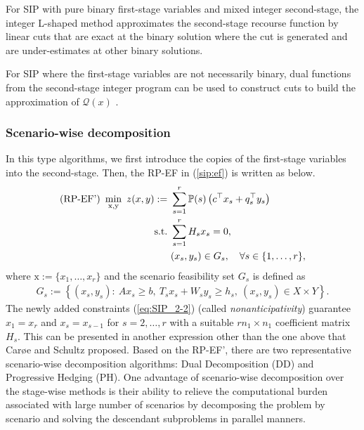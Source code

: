 For SIP with pure binary first-stage variables and mixed integer second-stage, the integer L-shaped method \cite{journal:LL1993} approximates the second-stage recourse function by linear cuts that are exact at the binary solution where the cut is generated and are under-estimates at other binary solutions. 

For SIP where the first-stage variables are not necessarily binary, dual functions from the second-stage integer program can be used to construct cuts to build the approximation of $\mathcal{Q}(x)$ \cite{journal:CT1998}.  %

\subsubsection{Scenario-wise decomposition}
In this type algorithms, we first introduce the copies of the first-stage variables into the second-stage. Then, the RP-EF in (\ref{sip:ef}) is written as below.
\begin{subequations} \label{sip:ef'}
	\begin{align}
	\textrm{(RP-EF') }\min_{\mathrm{x},\mathrm{y}}\ z(x,y):=\ &\sum_{s=1}^{r}\PP(s)\left(c^{\top}x_s+q_s^{\top}y_s\right)	\label{eq:SIP_2-1}\\ 
	\mathrm{s.t.}\ &\sum_{s=1}^{r}H_s x_s=0, \label{eq:SIP_2-2} \\
	\ &(x_s,y_s)\in G_s,\quad \forall s\in\{1,\ldots,r\},	\label{eq:SIP_2-3}
	\end{align}
\end{subequations}
where $\mathrm{x}:=\{x_1,\ldots,x_r\}$ and the scenario feasibility set $G_s$ is defined as
\begin{align} 
G_s:=\left\{ (x_s,y_s): \ Ax_s\ge b,\  T_s x_s+W_s y_s\ge h_s,\ (x_s,y_s)\in X\times Y  \right\}. \label{eq:SIP_2-4}
\end{align}
The newly added constraints (\ref{eq:SIP_2-2}) (called \textit{nonanticipativity}) guarantee $x_1=x_r$ and $x_s=x_{s-1}$ for $s=2,\ldots,r$ with a suitable $rn_1\times n_1$ coefficient matrix $H_s$. This can be presented in another expression other than the one above that Car\o e and Schultz \cite{journal:CS1999} proposed. Based on the RP-EF', there are two representative scenario-wise decomposition algorithms: Dual Decomposition (DD) and Progressive Hedging (PH). One advantage of scenario-wise decomposition over the stage-wise methods is their ability to relieve the computational burden associated with large number of scenarios by decomposing the problem by scenario and solving the descendant subproblems in parallel manners.

